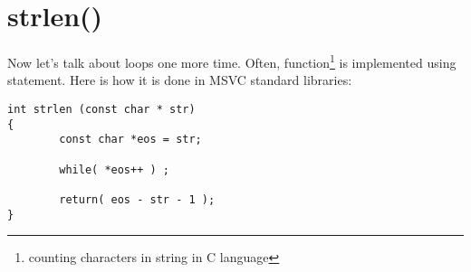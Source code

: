 ﻿\section{strlen()}

{Now let's talk about loops one more time. Often,  
function\footnote{counting characters in string in C language} is implemented using  
statement.}
{Here is how it is done in MSVC standard libraries:}

\begin{lstlisting}
int strlen (const char * str)
{
        const char *eos = str;

        while( *eos++ ) ;

        return( eos - str - 1 );
}
\end{lstlisting}



